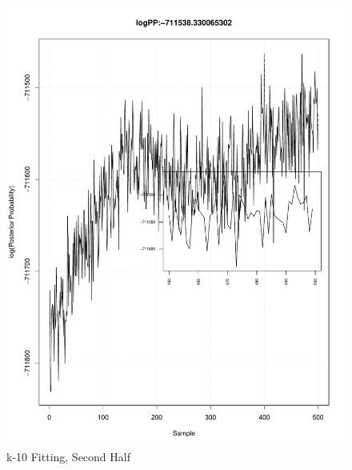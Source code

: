 \documentclass[11pt]{labbook}
\begin{document}
    \begin{figure}
        \centering
        \includegraphics[scale=.65]{FONSE_Plots/2016/December_14/k-10_loglike_final}
        \caption{k-10 Fitting, Second Half}
        \label{fig:k-10_2LIK}
    \end{figure}
\end{document}
